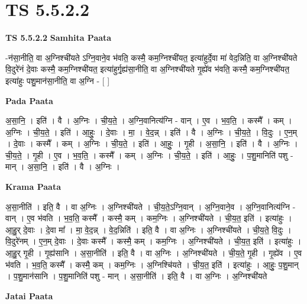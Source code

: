 \documentclass[17pt]{extarticle}
\begin{document}
\section{ TS 5.5.2.2 }

\textbf{TS 5.5.2.2 } \newline
\textbf{Samhita Paata} \newline

-न॑सा॒नीति॒ वा अ॒ग्निश्ची॑यते ऽग्नि॒वाने॒व भ॑वति॒ कस्मै॒ कम॒ग्निश्ची॑यत॒ इत्या॑हुर्दे॒वा मा॑ वेद॒न्निति॒ वा अ॒ग्निश्ची॑यते वि॒दुरे॑नं दे॒वाः कस्मै॒ कम॒ग्निश्ची॑यत॒ इत्या॑हुर्गृ॒ह्य॑सा॒नीति॒ वा अ॒ग्निश्ची॑यते गृ॒ह्ये॑व भ॑वति॒ कस्मै॒ कम॒ग्निश्ची॑यत॒ इत्या॑हुः पशु॒मान॑सा॒नीति॒ वा अ॒ग्नि - [  ] \newline

\textbf{Pada Paata} \newline

अ॒सा॒नि॒ । इति॑ । वै । अ॒ग्निः । ची॒य॒ते॒ । अ॒ग्नि॒वानित्य॑ग्नि - वान् । ए॒व । भ॒व॒ति॒ । कस्मै᳚ । कम् । अ॒ग्निः । ची॒य॒ते॒ । इति॑ । आ॒हुः॒ । दे॒वाः । मा॒ । वे॒द॒न्न् । इति॑ । वै । अ॒ग्निः । ची॒य॒ते॒ । वि॒दुः । ए॒न॒म् । दे॒वाः । कस्मै᳚ । कम् । अ॒ग्निः । ची॒य॒ते॒ । इति॑ । आ॒हुः॒ । गृ॒ही । अ॒सा॒नि॒ । इति॑ । वै । अ॒ग्निः । ची॒य॒ते॒ । गृ॒ही । ए॒व । भ॒व॒ति॒ । कस्मै᳚ । कम् । अ॒ग्निः । ची॒य॒ते॒ । इति॑ । आ॒हुः॒ । प॒शु॒मानिति॑ पशु - मान् । अ॒सा॒नि॒ । इति॑ । वै । अ॒ग्निः ।  \newline


\textbf{Krama Paata} \newline

अ॒सा॒नीति॑ । इति॒ वै । वा अ॒ग्निः । अ॒ग्निश्ची॑यते । ची॒य॒ते॒ऽग्नि॒वान् । अ॒ग्नि॒वाने॒व । अ॒ग्नि॒वानित्य॑ग्नि - वान् । ए॒व भ॑वति । भ॒व॒ति॒ कस्मै᳚ । कस्मै॒ कम् । कम॒ग्निः । अ॒ग्निश्ची॑यते । ची॒य॒त॒ इति॑ । इत्या॑हुः । आ॒हु॒र् दे॒वाः । दे॒वा मा᳚ । मा॒ वे॒द॒न्न् । वे॒द॒न्निति॑ । इति॒ वै । वा अ॒ग्निः । अ॒ग्निश्ची॑यते । ची॒य॒ते॒ वि॒दुः । वि॒दुरे॑नम् । ए॒न॒म् दे॒वाः । दे॒वाः कस्मै᳚ । कस्मै॒ कम् । कम॒ग्निः । अ॒ग्निश्ची॑यते । ची॒य॒त॒ इति॑ । इत्या॑हुः । आ॒हु॒र् गृ॒ही । गृ॒ह्य॑सानि । अ॒सा॒नीति॑ । इति॒ वै । वा अ॒ग्निः । अ॒ग्निश्ची॑यते । ची॒य॒ते॒ गृ॒ही । गृ॒ह्ये॑व । ए॒व भ॑वति । भ॒व॒ति॒ कस्मै᳚ । कस्मै॒ कम् । कम॒ग्निः । अ॒ग्निश्चि॑यते । ची॒य॒त॒ इति॑ । इत्या॑हुः । आ॒हुः॒ प॒शु॒मान् । प॒शु॒मान॑सानि । प॒शु॒मानिति॑ पशु - मान् । अ॒सा॒नीति॑ । इति॒ वै । वा अ॒ग्निः । अ॒ग्निश्ची॑यते \newline

\textbf{Jatai Paata} \newline
\end{document}
